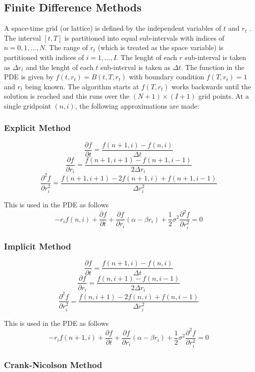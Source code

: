 \documentclass[12pt,a4paper]{article}
\begin{document}
\subsection{Finite Difference Methods}
\label{subsec: FD}
A space-time grid (or lattice) is defined by the independent variables of $t$ and $r_t$ \citep{crank}. The interval $[t,T]$ is partitioned into equal sub-intervals with indices of  $n=0,1,...,N$. The range of $r_t$ (which is treated as the space variable) is partitioned with indices of $i = 1,...,I$. The lenght of each $r$ sub-interval is taken as $\Delta r_t$ and the lenght of each $t$ sub-interval is taken as $\Delta t$. The function in the PDE is given by $f(t,r_t)= B(t,T,r_t)$ with boundary condition $f(T,r_t) = 1$ and $r_t$ being known. The algorithm starts at $f(T,r_t)$ works backwards until the solution is reached and this runs over the $(N+1)\times(I+1)$ grid points. At a single gridpoint $(n,i)$, the following approximations are made:
\subsubsection{Explicit Method}
\label{subsubsec: Explicit}
$$\frac{\partial f}{\partial t} = \frac{f(n+1,i) - f(n,i)}{\Delta t}$$
$$\frac{\partial f}{\partial r_i} = \frac{f(n+1,i+1) -f(n+1,i-1)}{2 \Delta r_i}$$
$$\frac{\partial^2 f}{\partial r_i^2} = \frac{f(n+1,i+1) - 2f(n+1,i) +f(n+1,i-1)}{\Delta r_i^2}$$

This is used in the PDE as follows
$$-r_i f(n,i)  + \frac{\partial f}{\partial t} + \frac{\partial f}{\partial r_i}(\alpha - \beta r_i) +\frac{1}{2} \sigma^2 \frac{\partial^2 f}{\partial r_i^2}  = 0 $$

\subsubsection{Implicit Method}
\label{subsubsec: Implicit}
$$\frac{\partial f}{\partial t} = \frac{f(n+1,i) - f(n,i)}{\Delta t}$$
$$\frac{\partial f}{\partial r_i} = \frac{f(n,i+1) -f(n,i-1)}{2 \Delta r_i}$$
$$\frac{\partial^2 f}{\partial r_i^2} = \frac{f(n,i+1) - 2f(n,i) +f(n,i-1)}{\Delta r_i^2}$$

This is used in the PDE as follows
$$-r_i f(n+1,i)  + \frac{\partial f}{\partial t} + \frac{\partial f}{\partial r_i}(\alpha - \beta r_i) +\frac{1}{2} \sigma^2 \frac{\partial^2 f}{\partial r_i^2}  = 0 $$
\subsubsection{Crank-Nicolson Method}
\label{subsubsec: Crank Method}
\end{document}

